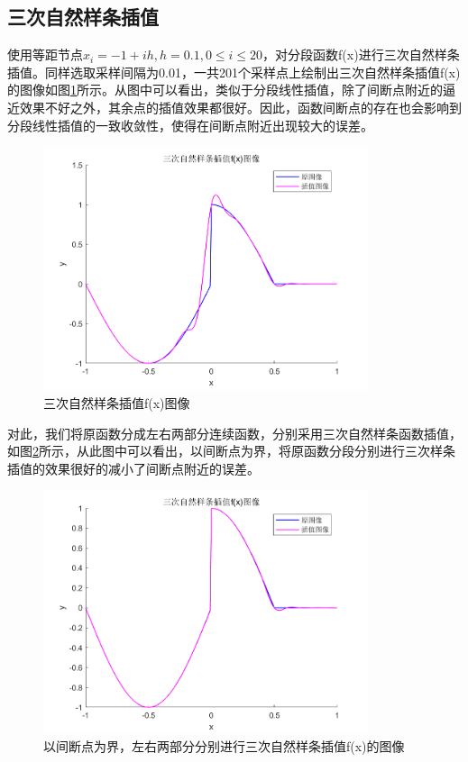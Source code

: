 \documentclass[a4paper]{article}
\begin{document}
\subsection{三次自然样条插值}
使用等距节点$x_i=-1+ih,h=0.1,0\le i\le 20$，对分段函数f(x)进行三次自然样条插值。同样选取采样间隔为0.01，一共201个采样点上绘制出三次自然样条插值f(x)的图像如图\ref{2fig:5}所示。从图中可以看出，类似于分段线性插值，除了间断点附近的逼近效果不好之外，其余点的插值效果都很好。因此，函数间断点的存在也会影响到分段线性插值的一致收敛性，使得在间断点附近出现较大的误差。

\begin{figure}[!h]
	\centering
	\includegraphics[width=0.85\textwidth]{../code/result/splinef}
	\caption{\label{2fig:5}三次自然样条插值f(x)图像}
\end{figure}

对此，我们将原函数分成左右两部分连续函数，分别采用三次自然样条函数插值，如图\ref{2fig:6}所示，从此图中可以看出，以间断点为界，将原函数分段分别进行三次样条插值的效果很好的减小了间断点附近的误差。

\begin{figure}[!h]
	\centering
	\includegraphics[width=0.85\textwidth]{../code/result/splinef1}
	\caption{\label{2fig:6}以间断点为界，左右两部分分别进行三次自然样条插值f(x)的图像}
\end{figure}
\end{document}
